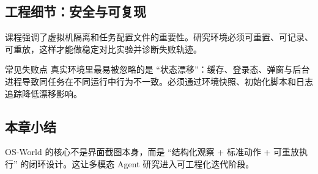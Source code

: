 \subsection{工程细节：安全与可复现}
课程强调了虚拟机隔离和任务配置文件的重要性。研究环境必须可重置、可记录、可重放，这样才能做稳定对比实验并诊断失败轨迹。

\begin{warningbox}{常见失败点}
真实环境里最易被忽略的是 ``状态漂移''：缓存、登录态、弹窗与后台进程导致同任务在不同运行中行为不一致。必须通过环境快照、初始化脚本和日志追踪降低漂移影响。
\end{warningbox}

\subsection{本章小结}
OS-World 的核心不是界面截图本身，而是 ``结构化观察 + 标准动作 + 可重放执行'' 的闭环设计。这让多模态 Agent 研究进入可工程化迭代阶段。


